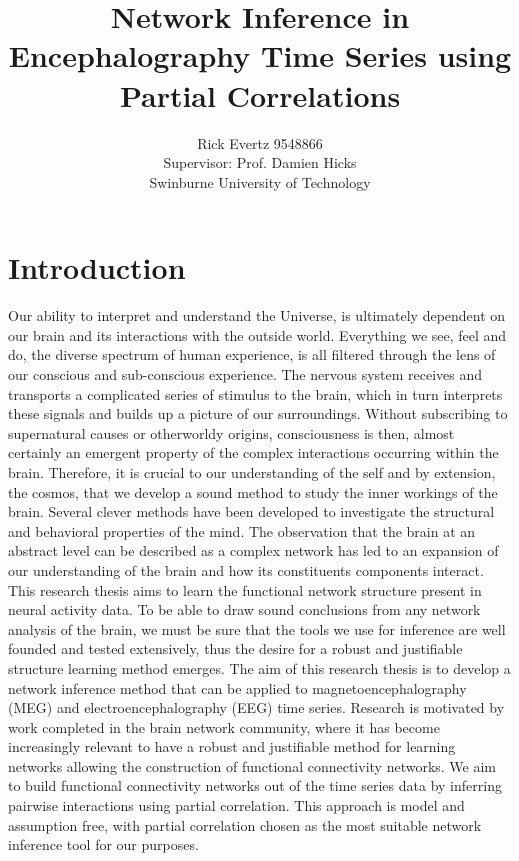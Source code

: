 \documentclass[11pt]{article}
\def\ni{\noindent}
\begin{document}
\title{\bf{Network Inference in Encephalography Time Series using Partial Correlations}}
\author{Rick Evertz 9548866\\
Supervisor: Prof. Damien Hicks\\
Swinburne University of Technology}
\date{}
\maketitle


\section{Introduction}
Our ability to interpret and understand the Universe, is ultimately dependent on our brain and its interactions with the outside world. Everything we see, feel and do, the diverse spectrum of human experience, is all filtered through the lens of our conscious and sub-conscious experience. The nervous system receives and transports a complicated series of stimulus to the brain, which in turn interprets these signals and builds up a picture of our surroundings. Without subscribing to supernatural causes or otherworldy origins, consciousness is then, almost certainly an emergent property of the complex interactions occurring within the brain. Therefore, it is crucial to our understanding of the self and by extension, the cosmos, that we develop a sound method to study the inner workings of the brain. Several clever methods have been developed to investigate the structural and behavioral properties of the mind. The observation that the brain at an abstract level can be described as a complex network has led to an expansion of our understanding of the brain and how its constituents components interact. This research thesis aims to learn the functional network structure present in neural activity data. To be able to draw sound conclusions from any network analysis of the brain, we must be sure that the tools we use for inference are well founded and tested extensively, thus the desire for a robust and justifiable structure learning method emerges. The aim of this research thesis is to develop a network inference method that can be applied to magnetoencephalography (MEG) and electroencephalography (EEG) time series. Research is motivated by work completed in the brain network community, where it has become increasingly relevant to have a robust and justifiable method for learning networks allowing the construction of functional connectivity networks. We aim to build functional connectivity networks out of the time series data by inferring pairwise interactions using partial correlation. This approach is model and assumption free, with partial correlation chosen as the most suitable network inference tool for our purposes.
\end{document}

